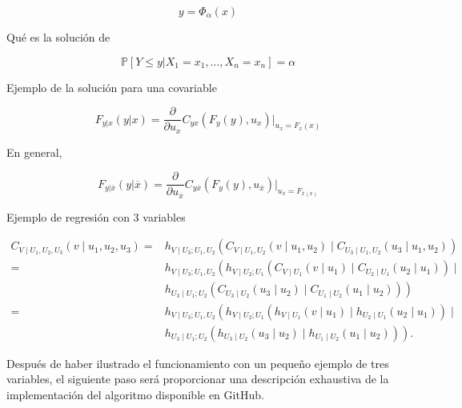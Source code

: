 \begin{equation}\label{regresion}
    y = \Phi_{\alpha}(x)
\end{equation}

Qué es la solución de 

\begin{equation}
     \mathbb{P}[Y \leq y | X_1 = x_1, \dots, X_n = x_n ] = \alpha
\end{equation}

Ejemplo de la solución para una covariable

\begin{equation}
    F_{y|x}(y|x) = \frac{\partial }{\partial u_x} C_{yx}(F_y(y), u_x) \Big|_{u_x = F_x(x)}  
\end{equation}

En general, 

\begin{equation}
    F_{y|\overline{x}}(y|\overline{x}) = \frac{\partial }{\partial u_{\overline{x}}} C_{y\overline{x}}(F_y(y), u_{\overline{x}}) \Big|_{u_{\overline{x}} =F_{\overline{x}(x)}} 
\end{equation}

Ejemplo de regresión con 3 variables 

\begin{equation}
    \begin{aligned}
    C_{V \mid U_1, U_2, U_3}\left(v \mid u_1, u_2, u_3\right) 
    = & h_{V \mid U_3 ; U_1, U_2}\left(C_{V \mid U_1, U_2}\left(v \mid u_1, u_2\right) \mid C_{U_3 \mid U_1, U_2}\left(u_3 \mid u_1, u_2\right)\right) \\
    = & h_{V \mid U_3 ; U_1, U_2}\left(h_{V \mid U_2 ; U_1}\left(C_{V \mid U_1}\left(v \mid u_1\right) \mid C_{U_2 \mid U_1}\left(u_2 \mid u_1\right)\right) \mid\right. \\
    & \left.h_{U_3 \mid U_1 ; U_2}\left(C_{U_3 \mid U_2}\left(u_3 \mid u_2\right) \mid C_{U_1 \mid U_2}\left(u_1 \mid u_2\right)\right)\right) \\ 
    = & h_{V \mid U_3 ; U_1, U_2}\left(h_{V \mid U_2 ; U_1}\left(h_{V \mid U_1}\left(v \mid u_1\right) \mid h_{U_2 \mid U_1}\left(u_2 \mid u_1\right)\right) \mid\right. \\
    & \left.h_{U_3 \mid U_1 ; U_2}\left(h_{U_3 \mid U_2}\left(u_3 \mid u_2\right) \mid h_{U_1 \mid U_2}\left(u_1 \mid u_2\right)\right)\right).
    \end{aligned}
\end{equation}


Después de haber ilustrado el funcionamiento con un pequeño ejemplo de tres variables, el siguiente paso será proporcionar una descripción exhaustiva de la implementación del algoritmo disponible en GitHub.

